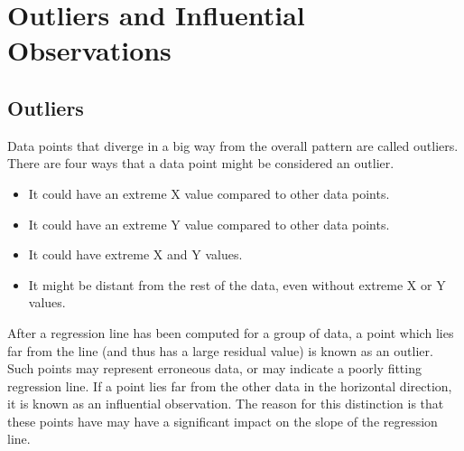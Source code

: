 \documentclass[residuals.tex]{subfiles}
\begin{document}
\newpage
\section{Outliers and Influential Observations}
\subsection{Outliers}

Data points that diverge in a big way from the overall pattern are called outliers. There are four ways that a data point might be considered an outlier.

\begin{itemize}
	\item It could have an extreme X value compared to other data points.
	\item It could have an extreme Y value compared to other data points.
	\item It could have extreme X and Y values.
	\item It might be distant from the rest of the data, even without extreme X or Y values.
\end{itemize}

After a regression line has been computed for a group of data, a point which lies far from the line (and thus has a large residual value) is known as an outlier. Such points may represent erroneous data, or may indicate a poorly fitting regression line. If a point lies far from the other data in the horizontal direction, it is known as an influential observation. The reason for this distinction is that these points have may have a significant impact on the slope of the regression line.
\end{document}
